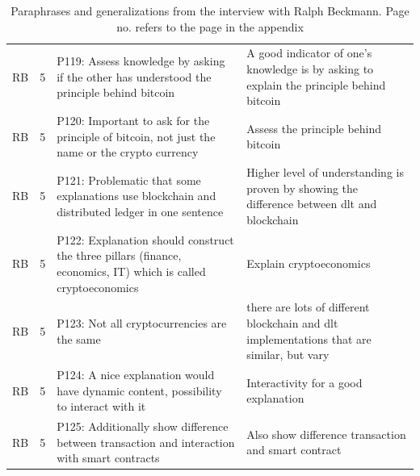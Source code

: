 \begin{table}[H]
\begin{tabularx}{\textwidth}{ll|X|p{4.5cm}}
	RB & 5 & P119: Assess knowledge by asking if the other has understood the principle behind bitcoin & A good indicator of one's knowledge is by asking to explain the principle behind bitcoin   \\  
	RB & 5 & P120: Important to ask for the principle of bitcoin, not just the name or the crypto currency & Assess the principle behind bitcoin   \\  
	RB & 5 & P121: Problematic that some explanations use blockchain and distributed ledger in one sentence & Higher level of understanding is proven by showing the difference between dlt and blockchain   \\  
	RB & 5 & P122: Explanation should construct the three pillars (finance, economics, IT) which is called cryptoeconomics & Explain cryptoeconomics   \\  
	RB & 5 & P123: Not all cryptocurrencies are the same & there are lots of different blockchain and dlt implementations that are similar, but vary   \\  
	RB & 5 & P124: A nice explanation would have dynamic content, possibility to interact with it & Interactivity for a good explanation   \\  
	RB & 5 & P125: Additionally show difference between transaction and interaction with smart contracts & Also show difference transaction and smart contract   \\  
    \end{tabularx}
    \caption{Paraphrases and generalizations from the interview with Ralph Beckmann. Page no. refers to the page in the appendix}
    \label{tab:my_label4}
\end{table}

